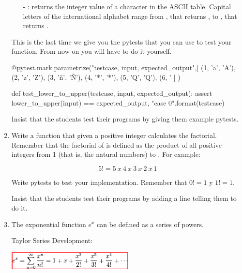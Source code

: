 \documentclass[
  fontsize=10pt,
  a4paper,
]{scrartcl}
\newenvironment{howTILEd}%
  {\begin{mdframed}[skipabove=10pt,skipbelow=10pt,backgroundcolor=pink!40]}%
  {\end{mdframed}}
\begin{document}
\begin{enumerate}
\begin{itemize}
\item[-] : returns the integer value of a character in the ASCII table. Capital letters of the international alphabet range from
, that returns , to , that returns .
\end{itemize}


This is the last time we give you the pytests that you can use to test your function. From now on you will have to do it yourself.

\begin{python}
@pytest.mark.parametrize("testcase, input, expected_output",[
    (1, 'a', 'A'),
    (2, 'z', 'Z'),
    (3, 'ñ', 'Ñ'),
    (4, '*', '*'),
    (5, 'Q', 'Q'),
    (6, '%
    ]
)

def test_lower_to_upper(testcase, input, expected_output):
    assert lower_to_upper(input) == expected_output, "case {0}".format(testcase)
\end{python}

\begin{howTILEd}
Insist that the students test their programs by giving them example pytests.
\end{howTILEd}



\item Write a function  that given a positive integer  calculates the factorial.
%
Remember that the factorial of  is defined as the product of all positive integers from 1 (that is, the natural numbers) to . For example:

\[5! = 5\ x\ 4\ x\ 3\ x\ 2\ x\ 1\]

Write pytests to test your implementation. Remember that $0! = 1$ y $1! = 1$. 

\begin{howTILEd}
Insist that the students test their programs by adding a line telling them to do it.
\end{howTILEd}


\item The exponential function $e^x$ can be defined as a series of powers.

Taylor Series Development:

\includegraphics[width=0.5\textwidth]{images/Taylor.png}


\end{enumerate}
\end{document}
